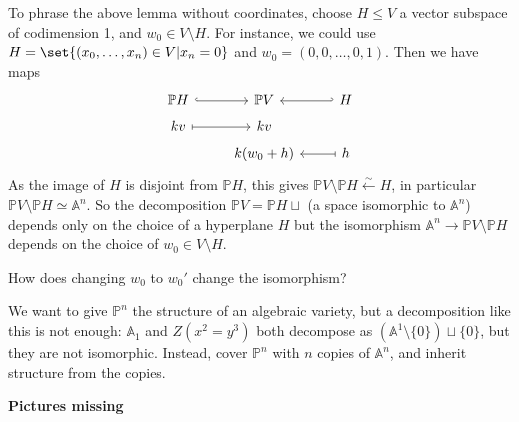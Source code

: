 \documentclass{article}
\newcommand{\A}{\mathbb{A}}
\newcommand{\proj}{\mathbb{P}}
\begin{document}
To phrase the above lemma without coordinates, choose $H \leq V$ a vector subspace of codimension 1, and $w_0 \in V \setminus H$.
For instance, we could use $H = \set{(x_0, \dotsc, x_n) \in V | x_n = 0}$ and $w_0 = (0, 0, \dotsc, 0, 1)$.
Then we have maps
\begin{equation*}
    \begin{tikzcd}[row sep=tiny]
        \proj H \rar[hook] & \proj V & H \lar[hook'] \\
        kv \rar[mapsto] & k v \\
                        & k(w_0 + h) \rar[mapsfrom] & h
    \end{tikzcd}
\end{equation*}
As the image of $H$ is disjoint from $\proj H$, this gives $\mathbb{P}V \setminus \mathbb{P}H \xleftarrow{\sim} H$, in particular $\mathbb{P}V \setminus \mathbb{P}H \simeq \A^n$.
So the decomposition $\mathbb{P}V = \mathbb{P}H \sqcup$ (a space isomorphic to $\A^n$) depends only on the choice of a hyperplane $H$ but the isomorphism $\A^n \to \mathbb{P}V \setminus \mathbb{P}H$ depends on the choice of $w_0 \in V \setminus H$.
\begin{ex}
How does changing $w_0$ to $w_0'$ change the isomorphism?
\end{ex}

\color{gray}
We want to give \hyperlink{def:proj}{$\mathbb{P}^n$} the structure of an algebraic variety, but a decomposition like this is not enough: $\A_1$ and $Z(x^2 = y^3)$ both decompose as $(\A^1 \setminus \{0\}) \sqcup \{0\}$, but they are not isomorphic.
Instead, cover \hyperlink{def:proj}{$\mathbb{P}^n$} with $n$ copies of $\A^n$, and inherit structure from the copies.




\textbf{Pictures missing}
\end{document}
